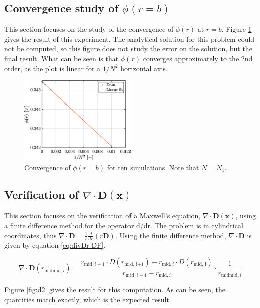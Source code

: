 \documentclass[a4paper,12pt,twoside]{article}
\newcommand{\mbf}[1]{\mathbf{#1}} %
\newcommand{\Div}[1]{\nabla\cdot\mathbf{#1}}
\newcommand{\bracket}[1]{\left(#1\right)}
\begin{document}
  \subsection{Convergence study of $\phi\bracket{r=b}$}
  This section focuses on the study of the convergence of $\phi\bracket{r}$ at $r=b$.
  Figure \ref{fig:d1-conv} gives the result of this experiment.
  The analytical solution for this problem could not be computed, so this figure does not study the error on the solution, but the final result.
  What can be seen is that $\phi\bracket{r}$ converges approximately to the 2nd order, as the plot is linear for a $1/N^2$ horizontal axis.

  \begin{figure}[h]
    \centering
    \includegraphics[width=0.5\textwidth]{graphs/exd1-convPhi.eps}
    \caption{Convergence of $\phi\bracket{r=b}$ for ten simulations. Note that $N=N_1$.}
    \label{fig:d1-conv}
  \end{figure}

  \subsection{Verification of $\Div{\mbf{D}\bracket{\mbf{x}}}$}
  This section focuses on the verification of a Maxwell's equation, $\Div{D}\bracket{\mbf{x}}$, using a finite difference method for the operator d/dr.
  The problem is in cylindrical coordinates, thus $\Div{D} = \frac{1}{r}\frac{d}{dr}\bracket{r\mbf{D}}$.
  Using the finite difference method, $\Div{D}$ is given by equation \eqref{eq:divDr-DF}.

  \begin{equation}
    \Div{D}\bracket{r_{\text{midmid},i}} = \frac{r_{\text{mid},i+1}\cdot D\bracket{r_\text{mid, i+1}} - r_{\text{mid},i}\cdot D\bracket{r_\text{mid, i}}}{r_{\text{mid},i+1} - r_{\text{mid},i}}\cdot\frac{1}{r_{\text{midmid},i}}
    \label{eq:divDr-DF}
  \end{equation}

  Figure \ref{fig:d2} gives the result for this computation.
  As can be seen, the quantities match exactly, which is the expected result.
\end{document}
